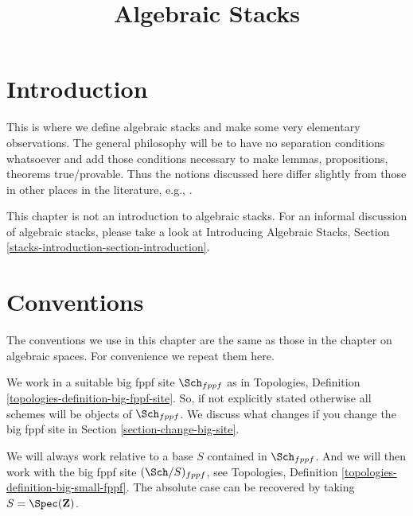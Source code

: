 

%


\title{Algebraic Stacks}


\maketitle

\label{section-phantom}

\tableofcontents

\section{Introduction}
\label{section-introduction}

\noindent
This is where we define algebraic stacks and make some very elementary
observations. The general philosophy will be to have no separation
conditions whatsoever and add those conditions necessary to make lemmas,
propositions, theorems true/provable. Thus the notions discussed here
differ slightly from those in other places in the literature, e.g.,
\cite{LM-B}.

\medskip\noindent
This chapter is not an introduction to algebraic stacks.
For an informal discussion of algebraic stacks, please take a look at
Introducing Algebraic Stacks, Section
\ref{stacks-introduction-section-introduction}.


\section{Conventions}
\label{section-conventions}

\noindent
The conventions we use in this chapter are the same as those in the
chapter on algebraic spaces. For convenience we repeat them here.

\medskip\noindent
We work in a suitable big fppf site $\Sch_{fppf}$
as in Topologies, Definition \ref{topologies-definition-big-fppf-site}.
So, if not explicitly stated otherwise all schemes will be objects
of $\Sch_{fppf}$. We discuss what changes if you change the big
fppf site in
Section \ref{section-change-big-site}.

\medskip\noindent
We will always work relative to a base $S$ contained in $\Sch_{fppf}$.
And we will then work with the big fppf site $(\Sch/S)_{fppf}$, see
Topologies, Definition \ref{topologies-definition-big-small-fppf}.
The absolute case can be recovered by taking
$S = \Spec(\mathbf{Z})$.

